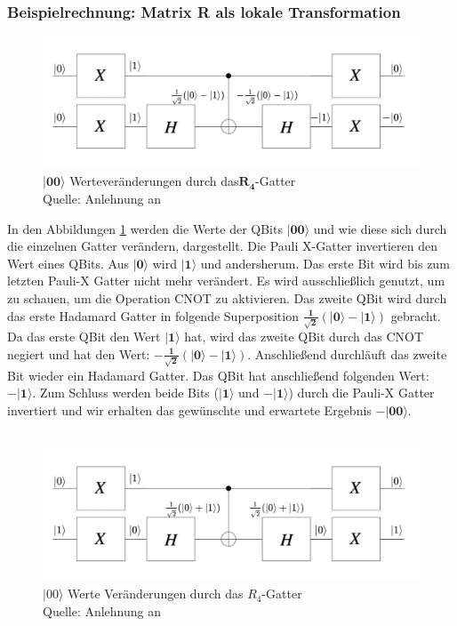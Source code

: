 \subsubsection{Beispielrechnung: Matrix R als lokale Transformation}
\begin{figure}[hbtp]
	\centering
	\includegraphics[width=.8\textwidth]{figures/RGatter00.png}
	\caption{$\mathbf{|00\rangle}$ Werteveränderungen durch das$\mathbf{R_4}$-Gatter \\ Quelle: Anlehnung an \cite[S. 145]{Homeister.2018}}
	\label{fig:Rgatter00}
\end{figure}
In den Abbildungen \ref{fig:Rgatter00} werden die Werte der QBits $\mathbf{|00\rangle}$ und wie diese sich durch die einzelnen Gatter verändern, dargestellt.
Die Pauli X-Gatter invertieren den Wert eines QBits. Aus $\mathbf{|0\rangle}$ wird $\mathbf{|1\rangle}$ und andersherum. Das erste Bit wird bis zum letzten Pauli-X Gatter nicht mehr verändert. Es wird ausschließlich genutzt, um zu schauen, um die Operation CNOT zu aktivieren. Das zweite QBit wird durch das erste Hadamard Gatter in folgende Superposition $\mathbf{\frac{1}{\sqrt 2}(|0\rangle - |1\rangle)}$ gebracht. Da das erste QBit den Wert $\mathbf{|1\rangle}$ hat, wird das zweite QBit durch das CNOT negiert und hat den Wert: $\mathbf{-\frac{1}{\sqrt 2}(|0\rangle - |1\rangle)}$. Anschließend durchläuft das zweite Bit wieder ein Hadamard Gatter. Das QBit hat anschließend folgenden Wert: $\mathbf{-|1\rangle}$.
Zum Schluss werden beide Bits ($\mathbf{|1\rangle}$ und $\mathbf{-|1\rangle}$) durch die Pauli-X Gatter invertiert und wir erhalten das gewünschte und erwartete Ergebnis $\mathbf{-|00\rangle}$.
\\
\\
\begin{figure}[hbtp]
	\centering
	\includegraphics[width=.8\textwidth]{figures/RGatter01.png}
	\caption{$|00\rangle$ Werte Veränderungen durch das $R_4$-Gatter \\ Quelle: Anlehnung an \cite[S. 145]{Homeister.2018}}
	\label{fig:Rgatter01}
\end{figure}
